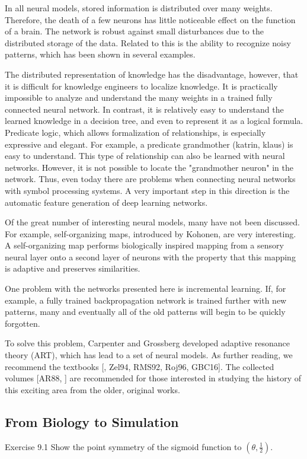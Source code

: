 \documentclass[10pt]{book}
\begin{document}
In all neural models, stored information is distributed over many weights. Therefore, the death of a few neurons has little noticeable effect on the function of a brain. The network is robust against small disturbances due to the distributed storage of the data. Related to this is the ability to recognize noisy patterns, which has been shown in several examples.

The distributed representation of knowledge has the disadvantage, however, that it is difficult for knowledge engineers to localize knowledge. It is practically impossible to analyze and understand the many weights in a trained fully connected neural network. In contrast, it is relatively easy to understand the learned knowledge in a decision tree, and even to represent it as a logical formula. Predicate logic, which allows formalization of relationships, is especially expressive and elegant. For example, a predicate grandmother (katrin, klaus) is easy to understand. This type of relationship can also be learned with neural networks. However, it is not possible to locate the "grandmother neuron" in the network. Thus, even today there are problems when connecting neural networks with symbol processing systems. A very important step in this direction is the automatic feature generation of deep learning networks.

Of the great number of interesting neural models, many have not been discussed. For example, self-organizing maps, introduced by Kohonen, are very interesting. A self-organizing map performs biologically inspired mapping from a sensory neural layer onto a second layer of neurons with the property that this mapping is adaptive and preserves similarities.

One problem with the networks presented here is incremental learning. If, for example, a fully trained backpropagation network is trained further with new patterns, many and eventually all of the old patterns will begin to be quickly forgotten.

To solve this problem, Carpenter and Grossberg developed adaptive resonance theory (ART), which has lead to a set of neural models.
As further reading, we recommend the textbooks [\cite{bishop2005neural}, Zel94, RMS92, Roj96, GBC16]. The collected volumes [AR88, \cite{anderson1990neurocomputing2}] are recommended for those interested in studying the history of this exciting area from the older, original works.

\subsection{From Biology to Simulation}
Exercise 9.1 Show the point symmetry of the sigmoid function to $\left(\theta, \frac{1}{2}\right)$.
\end{document}
